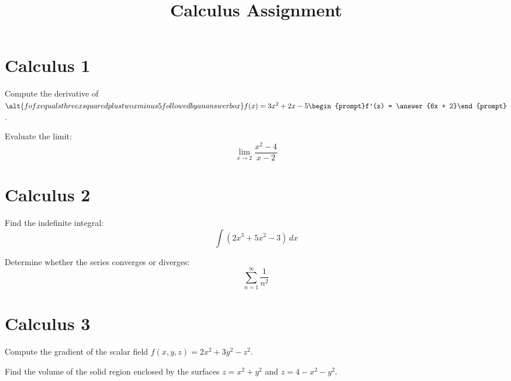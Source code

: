 \documentclass[noauthor,nooutcomes]{ximera}
\title{Calculus Assignment}
\begin{document}
\begin{abstract}
\end{abstract}
\maketitle


\section*{Calculus 1}

\begin{problem}
    Compute the derivative of $\alt{f of x equals three x squared plus
      two x minus 5 followed by an answer box} f(x) = 3x^2 + 2x -
    5 \begin{prompt}f'(x) = \answer{6x + 2}\end{prompt}$.
\end{problem}

\begin{problem}
    Evaluate the limit:
    \[
    \lim_{{x \to 2}} \frac{{x^2 - 4}}{{x - 2}}
    \]
\end{problem}

\section*{Calculus 2}

\begin{problem}
    Find the indefinite integral:
    \[
    \int (2x^3 + 5x^2 - 3) \,dx
    \]
\end{problem}

\begin{problem}
    Determine whether the series converges or diverges:
    \[
    \sum_{n=1}^{\infty} \frac{1}{n^2}
    \]
\end{problem}

\section*{Calculus 3}

\begin{problem}
    Compute the gradient of the scalar field $f(x, y, z) = 2x^2 + 3y^2 - z^2$.
\end{problem}

\begin{problem}
    Find the volume of the solid region enclosed by the surfaces $z = x^2 + y^2$ and $z = 4 - x^2 - y^2$.
\end{problem}
\end{document}
